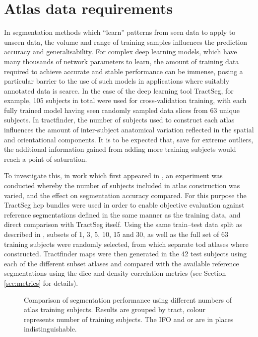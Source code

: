 \section{Atlas data requirements}\label{sec:ntrain}

In segmentation methods which ``learn'' patterns from seen data to apply to unseen data, the volume and range of training samples influences the prediction accuracy and generalisability.
For complex deep learning models, which have many thousands of network parameters to learn, the amount of training data required to achieve accurate and stable performance can be immense, posing a particular barrier to the use of such models in applications where suitably annotated data is scarce.
In the case of the deep learning tool TractSeg\autocite{Wasserthal2018}, for example, 105 subjects in total were used for cross-validation training, with each fully trained model having seen randomly sampled data slices from 63 unique subjects.
In tractfinder, the number of subjects used to construct each atlas influences the amount of inter-subject anatomical variation reflected in the spatial and orientational components.
It is to be expected that, save for extreme outliers, the additional information gained from adding more training subjects would reach a point of saturation.

To investigate this, in work which first appeared in \textcite{Young2023}, an experiment was conducted whereby the number of subjects included in atlas construction was varied, and the effect on segmentation accuracy compared.
For this purpose the TractSeg \gls{hcp} bundles were used in order to enable objective evaluation against reference segmentations defined in the same manner as the training data, and direct comparison with TractSeg itself.
Using the same train--test data split as described in \textcite{Wasserthal2018b}, subsets of 1, 3, 5, 10, 15 and 30, as well as the full set of 63 training subjects were randomly selected, from which separate \gls{tod} atlases where constructed.
Tractfinder maps were then generated in the 42 test subjects using each of the different subset atlases and compared with the available reference segmentations using the \gls{dice} and density correlation metrics (see Section \ref{sec:metrics} for details).

\begin{figure}[htb!]
    \centering
    \caption{Comparison of segmentation performance using different numbers of atlas training subjects. Results are grouped by tract, colour represents number of training subjects. The IFO and \gls{or} are in places indistinguishable. }
    \label{fig:ntrain}
\end{figure}

